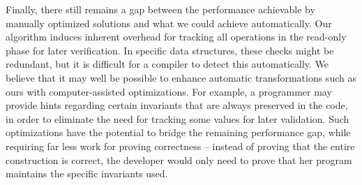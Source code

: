 Finally, there still remains a gap between the performance achievable by manually optimized solutions and what we could achieve automatically. Our algorithm induces inherent overhead for tracking all operations in the read-only phase for later verification.
In specific data structures, these checks might be redundant, but it is difficult for a compiler to detect this automatically. We believe that
it may well be possible to enhance automatic transformations such as ours with computer-assisted optimizations. For example, a programmer may provide hints regarding certain
invariants that are always preserved in the code, in order to eliminate the need for tracking some values for later
validation. Such optimizations have the potential to bridge the remaining performance gap, while requiring far less work
for proving correctness -- instead of proving that the entire construction is correct, the developer would only need to
prove that her program maintains the specific invariants used.
